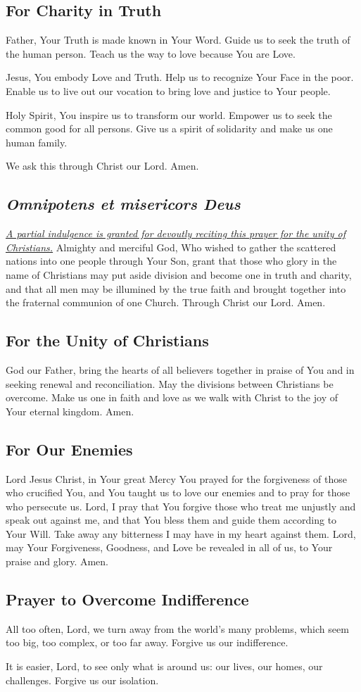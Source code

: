 \documentclass[12pt]{article}
\newcommand{\prayertitle}[1]{\subsection{#1}}
\newcommand{\indulgencedprayertitle}[1]{\prayertitle{#1 \protect\kreuz}}
\newcommand{\emphasis}[1]{\emph{#1}}
\newcommand{\emphasis}[1]{\textsl{#1}}
\newcommand{\foreign}[1]{\emphasis{#1}}
\newcommand{\note}[1]{{\small{\emphasis{#1}}}\newline}
\newcommand{\linkednote}[2]{\hyperlink{#1}{\note{#2}}}
\begin{document}
\prayertitle{For Charity in Truth}
\label{prayer:charity_truth}
Father, Your Truth is made known in Your Word.
Guide us to seek the truth of the human person.
Teach us the way to love because You are Love.

Jesus, You embody Love and Truth.
Help us to recognize Your Face in the poor.
Enable us to live out our vocation to bring love and justice to Your people.

Holy Spirit, You inspire us to transform our world.
Empower us to seek the common good for all persons.
Give us a spirit of solidarity and make us one human family.

We ask this through Christ our Lord. Amen.

\indulgencedprayertitle{\foreign{Omnipotens et misericors Deus}}
\linkednote{grant11}{A partial indulgence is granted for devoutly reciting this prayer for the unity of Christians.}
Almighty and merciful God, Who wished to gather the scattered nations into one people
through Your Son, grant that those who glory in the name of Christians may put aside
division and become one in truth and charity, and that all men may be illumined by the
true faith and brought together into the fraternal communion of one Church.
Through Christ our Lord. Amen.

\prayertitle{For the Unity of Christians}
God our Father, bring the hearts of all believers together in praise of You and in seeking renewal and reconciliation.
May the divisions between Christians be overcome.
Make us one in faith and love as we walk with Christ to the joy of Your eternal kingdom.
Amen.

\prayertitle{For Our Enemies}
Lord Jesus Christ, in Your great Mercy You prayed for the forgiveness of those who crucified You, and You taught us to love our enemies and to pray for those who persecute us.
Lord, I pray that You forgive those who treat me unjustly and speak out against me, and that You bless them and guide them according to Your Will.
Take away any bitterness I may have in my heart against them.
Lord, may Your Forgiveness, Goodness, and Love be revealed in all of us, to Your praise and glory.
Amen.

\prayertitle{Prayer to Overcome Indifference}
\label{prayer:indifference}
All too often, Lord, we turn away from the world's many problems, which seem too big, too complex, or too far away.
Forgive us our indifference.

It is easier, Lord, to see only what is around us:
our lives, our homes, our challenges.
Forgive us our isolation.
\end{document}
